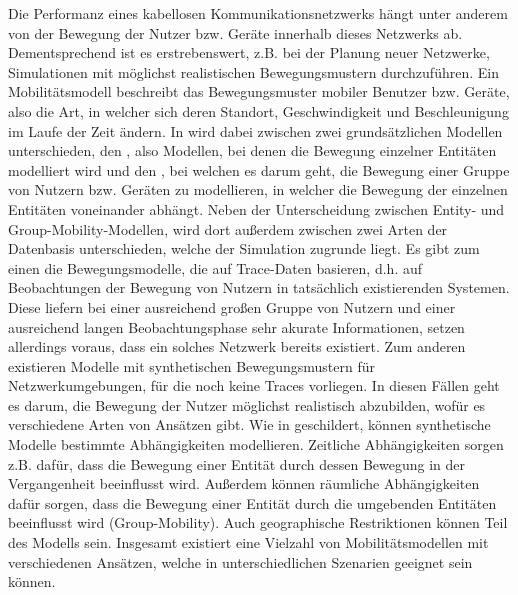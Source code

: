\documentclass[12pt, a4paper]{article}
\begin{document}
Die Performanz eines kabellosen Kommunikationsnetzwerks hängt unter anderem von der Bewegung 
der Nutzer bzw. Geräte innerhalb dieses Netzwerks ab. \cite{Camp2002} Dementsprechend ist es erstrebenswert,
z.B. bei der Planung neuer Netzwerke, Simulationen mit möglichst realistischen Bewegungsmustern durchzuführen.
Ein Mobilitätsmodell beschreibt das Bewegungsmuster mobiler Benutzer bzw. Geräte,
also die Art, in welcher sich deren Standort, Geschwindigkeit und Beschleunigung im Laufe der Zeit ändern. \cite{Chaturvedi2014}
In \cite{Camp2002} wird dabei zwischen zwei grundsätzlichen Modellen unterschieden, den ,
also Modellen, bei denen die Bewegung einzelner Entitäten modelliert wird und den ,
bei welchen es darum geht, die Bewegung einer Gruppe von Nutzern bzw. Geräten zu modellieren,
in welcher die Bewegung der einzelnen Entitäten voneinander abhängt.
Neben der Unterscheidung zwischen Entity- und Group-Mobility-Modellen, wird dort außerdem zwischen zwei Arten der Datenbasis unterschieden,
welche der Simulation zugrunde liegt. Es gibt zum einen die Bewegungsmodelle, die auf Trace-Daten basieren, d.h. auf Beobachtungen
der Bewegung von Nutzern in tatsächlich existierenden Systemen. Diese liefern bei einer ausreichend großen Gruppe von Nutzern
und einer ausreichend langen Beobachtungsphase sehr akurate Informationen, setzen allerdings voraus, dass ein solches Netzwerk
bereits existiert. \cite{Camp2002} Zum anderen existieren Modelle mit synthetischen Bewegungsmustern für Netzwerkumgebungen, 
für die noch keine Traces vorliegen. In diesen Fällen geht es darum, die Bewegung der Nutzer möglichst realistisch abzubilden,
wofür es verschiedene Arten von Ansätzen gibt.
Wie in \cite{Aschenbruck2011} geschildert, können synthetische Modelle bestimmte Abhängigkeiten modellieren.
Zeitliche Abhängigkeiten sorgen z.B. dafür, dass die Bewegung einer Entität durch dessen Bewegung in der Vergangenheit
beeinflusst wird. Außerdem können räumliche Abhängigkeiten dafür sorgen, dass die Bewegung einer Entität durch die umgebenden 
Entitäten beeinflusst wird (Group-Mobility). Auch geographische Restriktionen können Teil des Modells sein.
Insgesamt existiert eine Vielzahl von Mobilitätsmodellen mit verschiedenen Ansätzen, 
welche in unterschiedlichen Szenarien geeignet sein können.
\end{document}
